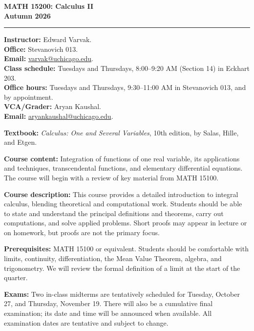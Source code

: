 \documentclass[12pt,letterpaper]{article}
\begin{document}
\begin{center}
  \textbf{\large MATH 15200: Calculus II}\\
  \textbf{Autumn 2026}
\end{center}

\vspace{0.4em}
\hrule
\vspace{0.4em}

\textbf{Instructor:} Edward Varvak.\\
\textbf{Office:} Stevanovich 013.\\
\textbf{Email:} \href{mailto:varvak@uchicago.edu}{varvak@uchicago.edu}.\\
\textbf{Class schedule:} Tuesdays and Thursdays, 8:00--9:20 AM (Section 14) in Eckhart 203.\\
\textbf{Office hours:} Tuesdays and Thursdays, 9:30--11:00 AM in Stevanovich 013, and by appointment.\\[1em]
\textbf{VCA/Grader:} Aryan Kaushal.\\
\textbf{Email:} \href{mailto:aryankaushal@uchicago.edu}{aryankaushal@uchicago.edu}.

\textbf{Textbook:} \textit{Calculus: One and Several Variables}, 10th edition, by Salas, Hille, and Etgen.

\textbf{Course content:} Integration of functions of one real variable, its applications and techniques, transcendental functions, and elementary differential equations. The course will begin with a review of key material from MATH 15100.

\textbf{Course description:} This course provides a detailed introduction to integral calculus, blending theoretical and computational work. Students should be able to state and understand the principal definitions and theorems, carry out computations, and solve applied problems. Short proofs may appear in lecture or on homework, but proofs are not the primary focus.

\textbf{Prerequisites:} MATH 15100 or equivalent. Students should be comfortable with limits, continuity, differentiation, the Mean Value Theorem, algebra, and trigonometry. We will review the formal definition of a limit at the start of the quarter.

\textbf{Exams:} Two in-class midterms are tentatively scheduled for Tuesday, October 27, and Thursday, November 19. There will also be a cumulative final examination; its date and time will be announced when available. All examination dates are tentative and subject to change.
\end{document}
